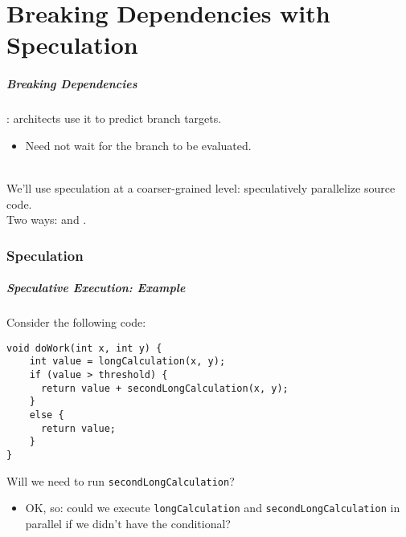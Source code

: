 \documentclass[aspectratio=43]{beamer}
\newenvironment{changemargin}[1]{%
  \begin{list}{}{%
    \setlength{\topsep}{0pt}%
    \setlength{\leftmargin}{#1}%
    \setlength{\rightmargin}{1em}
    \setlength{\listparindent}{\parindent}%
    \setlength{\itemindent}{\parindent}%
    \setlength{\parsep}{\parskip}%
  }%
  \item[]}{\end{list}}
\begin{document}
\part{Breaking Dependencies with Speculation}
\frame{\partpage}

\begin{frame}
  \frametitle{Breaking Dependencies}

  \begin{changemargin}{2cm}
  : architects use it to predict
      branch targets.
  \begin{itemize}
    \item Need not wait for the branch to be evaluated.
  \end{itemize}~\\[1em]
  We'll use speculation at a coarser-grained level:
      speculatively parallelize source code.\\[1em]

      Two ways:  and
      .
  \end{changemargin}
\end{frame}


\section{Speculation}
\begin{frame}[fragile]
  \frametitle{Speculative Execution: Example}

  \begin{changemargin}{2cm}
Consider the following code:
  
  \begin{lstlisting}
void doWork(int x, int y) {
    int value = longCalculation(x, y);
    if (value > threshold) {
      return value + secondLongCalculation(x, y);
    }
    else {
      return value;
    }
}
  \end{lstlisting}

  Will we need to run {\tt secondLongCalculation}?
  \vfill  
  \begin{itemize}
    \item<2> OK, so: could we execute {\tt longCalculation} and {\tt secondLongCalculation}
      in parallel if we didn't have the conditional?
  \end{itemize}
  \end{changemargin}
\end{frame}
\end{document}
